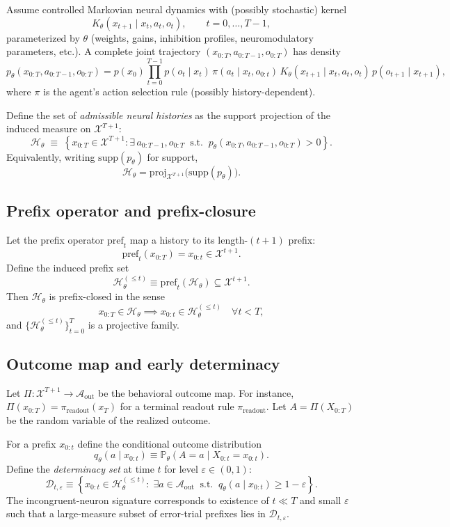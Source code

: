 \documentclass[11pt]{article}
\newcommand{\histories}{\mathcal{H}}
\begin{document}
Assume controlled Markovian neural dynamics with (possibly stochastic) kernel
\[
K_\theta(x_{t+1}\mid x_t,a_t,o_t), \qquad t=0,\dots,T-1,
\]
parameterized by $\theta$ (weights, gains, inhibition profiles, neuromodulatory parameters, etc.). A complete joint trajectory $(x_{0:T},a_{0:T-1},o_{0:T})$ has density
\[
p_\theta(x_{0:T},a_{0:T-1},o_{0:T})
=
p(x_0)\prod_{t=0}^{T-1} p(o_t\mid x_t)\, \pi(a_t\mid x_t,o_{0:t})\, K_\theta(x_{t+1}\mid x_t,a_t,o_t)\, p(o_{t+1}\mid x_{t+1}),
\]
where $\pi$ is the agent's action selection rule (possibly history-dependent).

Define the set of \emph{admissible neural histories} as the support projection of the induced measure on $\mathcal{X}^{T+1}$:
\[
\histories_\theta
\;\equiv\;
\left\{
x_{0:T}\in \mathcal{X}^{T+1}
:
\exists\, a_{0:T-1},o_{0:T}\;\;\text{s.t.}\;\; p_\theta(x_{0:T},a_{0:T-1},o_{0:T})>0
\right\}.
\]
Equivalently, writing $\mathrm{supp}(p_\theta)$ for support,
\[
\histories_\theta = \mathrm{proj}_{\mathcal{X}^{T+1}}\bigl(\mathrm{supp}(p_\theta)\bigr).
\]

\subsection{Prefix operator and prefix-closure}

Let the prefix operator $\mathrm{pref}_t$ map a history to its length-$(t+1)$ prefix:
\[
\mathrm{pref}_t(x_{0:T}) = x_{0:t}\in\mathcal{X}^{t+1}.
\]
Define the induced prefix set
\[
\histories_{\theta}^{(\le t)} \equiv \mathrm{pref}_t(\histories_\theta)\subseteq \mathcal{X}^{t+1}.
\]
Then $\histories_\theta$ is prefix-closed in the sense
\[
x_{0:T}\in\histories_\theta \implies x_{0:t}\in \histories_{\theta}^{(\le t)}\quad\forall t<T,
\]
and $\{\histories_{\theta}^{(\le t)}\}_{t=0}^{T}$ is a projective family.

\subsection{Outcome map and early determinacy}

Let $\Pi:\mathcal{X}^{T+1}\to \mathcal{A}_\mathrm{out}$ be the behavioral outcome map. For instance, $\Pi(x_{0:T})=\pi_\mathrm{readout}(x_T)$ for a terminal readout rule $\pi_\mathrm{readout}$. Let $A=\Pi(X_{0:T})$ be the random variable of the realized outcome.

For a prefix $x_{0:t}$ define the conditional outcome distribution
\[
q_\theta(a\mid x_{0:t}) \equiv \mathbb{P}_\theta\!\left(A=a \mid X_{0:t}=x_{0:t}\right).
\]
Define the \emph{determinacy set} at time $t$ for level $\varepsilon\in(0,1)$:
\[
\mathcal{D}_{t,\varepsilon}
\equiv
\left\{x_{0:t}\in \histories_{\theta}^{(\le t)}:\; \exists a\in\mathcal{A}_\mathrm{out}\;\;\text{s.t.}\;\; q_\theta(a\mid x_{0:t})\ge 1-\varepsilon\right\}.
\]
The incongruent-neuron signature corresponds to existence of $t\ll T$ and small $\varepsilon$ such that a large-measure subset of error-trial prefixes lies in $\mathcal{D}_{t,\varepsilon}$.
\end{document}
